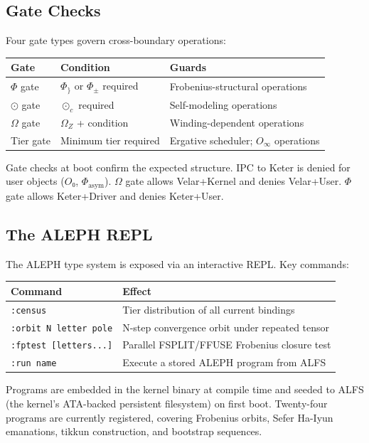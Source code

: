 \documentclass[12pt,a4paper]{article}
\begin{document}
\subsection{Gate Checks}

Four gate types govern cross-boundary operations:

\begin{tabularx}{\linewidth}{l l X}
\toprule
\textbf{Gate} & \textbf{Condition} & \textbf{Guards} \\
\midrule
$\Phi$ gate    & $\Phi_{\}}$ or $\Phi_{\pm}$ required  & Frobenius-structural operations \\
$\odot$ gate   & $\odot_c$ required                    & Self-modeling operations \\
$\Omega$ gate  & $\Omega_Z$ + \DH{} condition          & Winding-dependent operations \\
Tier gate & Minimum tier required & Ergative scheduler; $O_\infty$ operations \\
\bottomrule
\end{tabularx}

\medskip
Gate checks at boot confirm the expected structure. IPC to Keter is denied for user objects ($O₀$, $\Phi_{\text{asym}}$). $\Omega$ gate allows Velar+Kernel and denies Velar+User. $\Phi$ gate allows Keter+Driver and denies Keter+User.

\subsection{The ALEPH REPL}

The ALEPH type system is exposed via an interactive REPL. Key commands:

\begin{tabularx}{\linewidth}{l X}
\toprule
\textbf{Command} & \textbf{Effect} \\
\midrule
\texttt{:census} & Tier distribution of all current bindings \\
\texttt{:orbit N letter pole} & N-step convergence orbit under repeated tensor \\
\texttt{:fptest [letters...]} & Parallel FSPLIT/FFUSE Frobenius closure test \\
\texttt{:run name} & Execute a stored ALEPH program from ALFS \\
\bottomrule
\end{tabularx}

\medskip
Programs are embedded in the kernel binary at compile time and seeded to ALFS (the kernel's ATA-backed persistent filesystem) on first boot. Twenty-four programs are currently registered, covering Frobenius orbits, Sefer Ha-Iyun emanations, tikkun construction, and bootstrap sequences.
\end{document}
